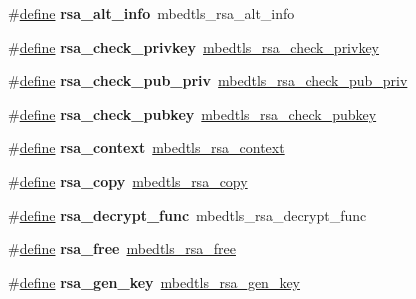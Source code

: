 \begin{DoxyCompactItemize}
\#\hyperlink{structdefine}{define} {\bfseries rsa\+\_\+alt\+\_\+info}~mbedtls\+\_\+rsa\+\_\+alt\+\_\+info
\item 
\mbox{\label{compat-1_83_8h_abf8260fd72bb12a534e1bf2d7461fda9}} 
\#\hyperlink{structdefine}{define} {\bfseries rsa\+\_\+check\+\_\+privkey}~\hyperlink{rsa_8h_ab393f7a4d3882ac0b2afa51b641bf475}{mbedtls\+\_\+rsa\+\_\+check\+\_\+privkey}
\item 
\mbox{\label{compat-1_83_8h_a53617449e08290f38a2e03eb250e8a0b}} 
\#\hyperlink{structdefine}{define} {\bfseries rsa\+\_\+check\+\_\+pub\+\_\+priv}~\hyperlink{rsa_8h_a3204b1f8a0dafb33b4ccc16570a40999}{mbedtls\+\_\+rsa\+\_\+check\+\_\+pub\+\_\+priv}
\item 
\mbox{\label{compat-1_83_8h_afec8c93feadde5baa2b1d3fa5be01bb9}} 
\#\hyperlink{structdefine}{define} {\bfseries rsa\+\_\+check\+\_\+pubkey}~\hyperlink{rsa_8h_ad5da263d80db9ee27f084b68b0092546}{mbedtls\+\_\+rsa\+\_\+check\+\_\+pubkey}
\item 
\mbox{\label{compat-1_83_8h_a295596f3cd34c76e7a66b9ba73de9250}} 
\#\hyperlink{structdefine}{define} {\bfseries rsa\+\_\+context}~\hyperlink{structmbedtls__rsa__context}{mbedtls\+\_\+rsa\+\_\+context}
\item 
\mbox{\label{compat-1_83_8h_a9788f057f5906d82e7d9b8ee63706a9d}} 
\#\hyperlink{structdefine}{define} {\bfseries rsa\+\_\+copy}~\hyperlink{rsa_8h_a6c88adae1a4e49c11d210c59dbc89f46}{mbedtls\+\_\+rsa\+\_\+copy}
\item 
\mbox{\label{compat-1_83_8h_a336cce629bae843fd442b3b60f9e7d2e}} 
\#\hyperlink{structdefine}{define} {\bfseries rsa\+\_\+decrypt\+\_\+func}~mbedtls\+\_\+rsa\+\_\+decrypt\+\_\+func
\item 
\mbox{\label{compat-1_83_8h_a49c2a690adb19a435a1edfaf645cea2c}} 
\#\hyperlink{structdefine}{define} {\bfseries rsa\+\_\+free}~\hyperlink{rsa_8h_a74eb13ecac0de582b01b4332c1d66494}{mbedtls\+\_\+rsa\+\_\+free}
\item 
\mbox{\label{compat-1_83_8h_aaacc997d1aa607cde19de05f971c074d}} 
\#\hyperlink{structdefine}{define} {\bfseries rsa\+\_\+gen\+\_\+key}~\hyperlink{rsa_8h_a421fc8812e75698e33887aafacb0c829}{mbedtls\+\_\+rsa\+\_\+gen\+\_\+key}

\end{DoxyCompactItemize}
